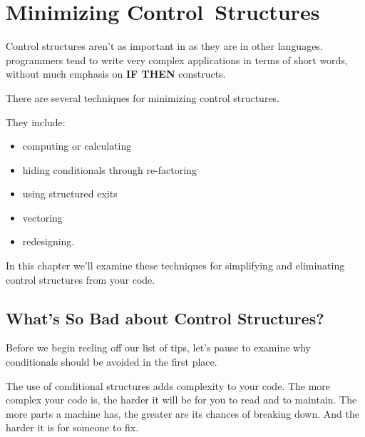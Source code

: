 

\chapter{Minimizing Control~Structures}

Control structures aren't as important in \Forth{} as they are in other
languages. \Forth{} programmers tend to write very complex applications
in terms of short words, without much emphasis on \textbf{IF THEN}
constructs.

There are several techniques for minimizing control structures.

They include:

\begin{itemize}
\item computing or calculating
\item hiding conditionals through re-factoring
\item using structured exits
\item vectoring
\item redesigning.
\end{itemize}

In this chapter we'll examine these techniques for simplifying and
eliminating control structures from your code.

\section{What's So Bad about Control Structures?}

Before we begin reeling off our list of tips, let's pause to examine why
conditionals should be avoided in the first place.

The use of conditional structures adds complexity to your code. The
more complex your code is, the harder it will be for you to read and to
maintain. The more parts a machine has, the greater are its chances of
breaking down. And the harder it is for someone to fix.

